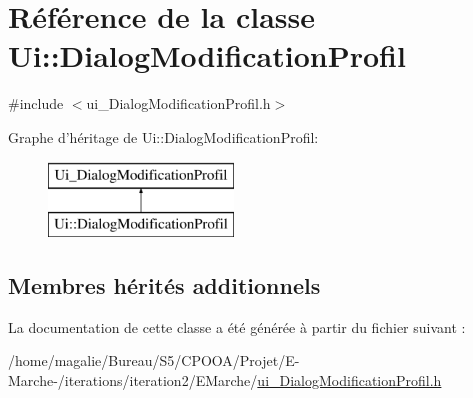 \hypertarget{class_ui_1_1_dialog_modification_profil}{\section{Référence de la classe Ui\-:\-:Dialog\-Modification\-Profil}
\label{class_ui_1_1_dialog_modification_profil}
}


{\ttfamily \#include $<$ui\-\_\-\-Dialog\-Modification\-Profil.\-h$>$}

Graphe d'héritage de Ui\-:\-:Dialog\-Modification\-Profil\-:\begin{figure}[H]
\begin{center}
\leavevmode
\includegraphics[height=2.000000cm]{class_ui_1_1_dialog_modification_profil}
\end{center}
\end{figure}
\subsection*{Membres hérités additionnels}


La documentation de cette classe a été générée à partir du fichier suivant \-:\begin{DoxyCompactItemize}
\item 
/home/magalie/\-Bureau/\-S5/\-C\-P\-O\-O\-A/\-Projet/\-E-\/\-Marche-\//iterations/iteration2/\-E\-Marche/\hyperlink{ui___dialog_modification_profil_8h}{ui\-\_\-\-Dialog\-Modification\-Profil.\-h}\end{DoxyCompactItemize}
